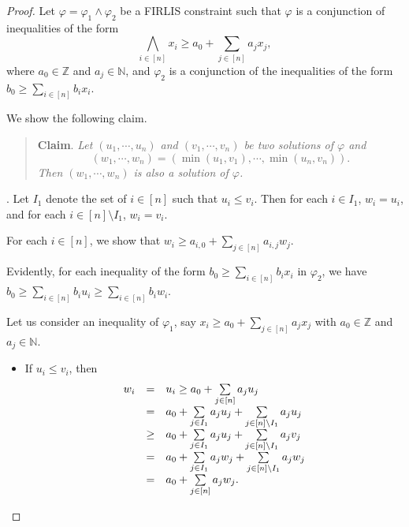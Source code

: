 \documentclass[runningheads]{llncs}
\newcommand\natnum{\mathbb{N}}
\newcommand\intnum{\mathbb{Z}}
\newcommand\firlis{FIRLIS}
\begin{document}
\begin{proof}
Let $\varphi = \varphi_1 \wedge \varphi_2$ be a {\firlis} constraint such that $\varphi$ is a conjunction of inequalities of the form
\[\bigwedge \limits_{i \in [n]} x_i \ge a_{0} + \sum \limits_{j \in [n]} a_{j} x_j,\]
where $a_{0} \in \intnum$ and $a_{j} \in \natnum$, and $\varphi_2$ is a conjunction of the inequalities of the form $b_0 \ge \sum \limits_{i \in [n]} b_i x_i$. 

We show the following claim. 

\begin{quote}
{\bf  Claim}. 
\it Let $(u_1, \cdots, u_n)$ and $(v_1, \cdots, v_n)$ be two solutions of $\varphi$ and 
\[(w_1, \cdots, w_n) = (\min(u_1, v_1), \cdots, \min(u_n, v_n)).\]
Then $(w_1, \cdots, w_n)$ is also a solution of $\varphi$.
\end{quote}

\smallskip

. 
%
Let $I_1$ denote the set of $i \in [n]$ such that $u_i \le v_i$. Then for each $i \in I_1$, $w_i = u_i$, and for each $i \in [n] \setminus I_1$, $w_i = v_i$.

For each $i \in [n]$, we show that $w_i \ge a_{i,0} + \sum \limits_{j \in [n]} a_{i,j} w_j$.

Evidently, for each inequality of the form $b_0 \ge \sum \limits_{i \in [n]} b_i x_i$ in $\varphi_2$, we have $b_0 \ge \sum \limits_{i \in [n]} b_i u_i \ge \sum \limits_{i \in [n]} b_i w_i$.

Let us consider an inequality of $\varphi_1$, say $x_i \ge a_{0} + \sum \limits_{j \in [n]} a_{j} x_j$ with $a_0 \in \intnum$ and $a_j \in \natnum$.
%
\begin{itemize}
\item If $u_i \le v_i$, then 
$$
\begin{array}{l c l}
w_i & = & u_i \ge a_{0} + \sum \limits_{j \in [n]} a_{j} u_j \\
& = & a_{0} + \sum \limits_{j \in I_1} a_{j} u_j + \sum \limits_{j \in [n] \setminus I_1} a_{j} u_j \\
& \ge & a_{0} + \sum \limits_{j \in I_1} a_{j} u_j + \sum \limits_{j \in [n] \setminus I_1} a_{j} v_j \\
& = & a_{0} + \sum \limits_{j \in I_1} a_{j} w_j + \sum \limits_{j \in [n] \setminus I_1} a_{j} w_j \\
& = & a_{0} + \sum \limits_{j \in [n]} a_{j} w_j. 
\end{array}
$$


\end{itemize}
\end{proof}
\end{document}
